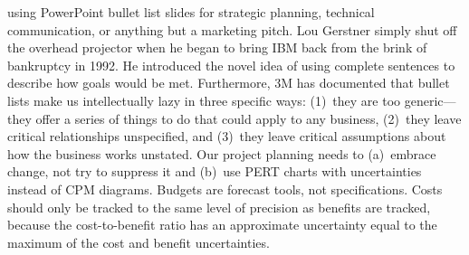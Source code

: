 \documentclass{tufte-handout}
\begin{document}
 using PowerPoint bullet list slides for strategic
planning, technical communication, or anything but a marketing pitch.
Lou Gerstner simply shut off the overhead projector when he
began to bring IBM back from the brink of bankruptcy in 1992.
He introduced the novel idea of using complete sentences to describe
how goals would be met.\cite{Gerstner2002}
Furthermore, 3M has documented\cite{Shaw1998}
that bullet lists make us intellectually
lazy in three specific ways: (1)~they are too generic---they offer a
series of things to do that could apply to any business, (2)~they leave
critical relationships unspecified, and (3)~they leave critical
assumptions about how the business works unstated.
Our project planning needs to (a)~embrace change, not try
to suppress it and (b)~use PERT charts with uncertainties
instead of CPM diagrams.\cite{Martin2003}
Budgets are forecast tools, not specifications.
Costs should only be tracked to the same level of precision as benefits
are tracked, because the cost-to-benefit ratio has an approximate
uncertainty equal to the maximum of the cost and benefit
uncertainties.\cite{DeMarco2003}



\end{document}
